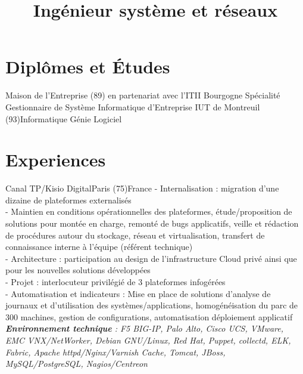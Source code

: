 \documentclass[10pt,a4paper]{moderncv}
\title{Ingénieur système et réseaux}
\begin{document}
\maketitle

\section{Diplômes et Études}
{Maison de l'Entreprise (89) en partenariat avec l'ITII Bourgogne}{}{}
{Spécialité Gestionnaire de Système Informatique d'Entreprise}
{IUT de Montreuil (93)}{}{}{Informatique Génie Logiciel}


\section{Experiences}
{Canal TP/Kisio Digital}{Paris (75)}{France}
{
- Internalisation : migration d'une dizaine de plateformes externalisés\\
- Maintien en conditions opérationnelles des plateformes, étude/proposition de solutions pour montée en charge, remonté de bugs applicatifs, veille et rédaction de procédures autour du stockage, réseau et virtualisation, transfert de connaissance interne à l'équipe (référent technique)\\
- Architecture : participation au design de l'infrastructure Cloud privé ainsi que pour les nouvelles solutions développées\\
- Projet : interlocuteur privilégié de 3 plateformes infogérées\\
- Automatisation et indicateurs : Mise en place de solutions d'analyse de journaux et d'utilisation des systèmes/applications, homogénéisation du parc de 300 machines, gestion de configurations, automatisation déploiement applicatif\\
\textit{\textbf{Environnement technique} : F5 BIG-IP, Palo Alto, Cisco UCS, VMware, EMC VNX/NetWorker, Debian GNU/Linux, Red Hat, Puppet, collectd, ELK, Fabric, Apache httpd/Nginx/Varnish Cache, Tomcat, JBoss, MySQL/PostgreSQL, Nagios/Centreon}
\newline{}
}
\end{document}
